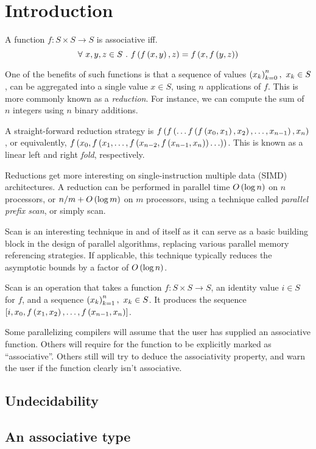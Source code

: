 \section{Introduction}

A function $f:S\times S\rightarrow S$ is associative iff.
\[\forall\ x,y,z\in S\ .\ f\p{f\p{x,y}, z} = f\p{x, f\p{y, z}}\]

One of the benefits of such functions is that a sequence of values
$\left({x_k}\right)_{k=0}^n,\ x_k\in S$, can be aggregated into a single value $x\in S$,
using $n$ applications of $f$. This is more commonly known as a
\emph{reduction}. For instance, we can compute the sum of $n$ integers using
$n$ binary additions.

A straight-forward reduction strategy is $f\left({f\left({\ldots f\left({f\left({x_0, x_1}\right),
x_2}\right), \ldots , x_{n-1}}\right), x_n}\right)$, or equivalently, $f\left({x_0, f\left({x_1, \ldots,
f\left({x_{n-2}, f\left({x_{n-1}, x_n}\right)}\right)\ldots}\right)}\right)$. This is known as a linear left and
right \emph{fold}, respectively.

Reductions get more interesting on single-instruction multiple data (SIMD)
architectures. A reduction can be performed in parallel time $O\left({\log n}\right)$ on
$n$ processors, or ${n/m}+O\left({\log m}\right)$ on $m$ processors, using a technique
called \emph{parallel prefix scan}, or simply scan.

Scan is an interesting technique in and of itself as it can serve as a basic
building block in the design of parallel algorithms, replacing various parallel
memory referencing strategies. If applicable, this technique typically reduces
the asymptotic bounds by a factor of $O\left({\log n}\right)$\cite{blelloch}.

Scan is an operation that takes a function $f:S\times S\rightarrow S$, an
identity value $i\in S$ for $f$, and a sequence $\left({x_k}\right)_{k=1}^n,\ x_k\in S$.
It produces the sequence $\left[{i, x_0, f\left({x_1,x_2}\right), \ldots, f\left({x_{n-1},
x_n}\right)}\right]$.

Some parallelizing compilers will assume that the user has supplied an
associative function. Others will require for the function to be explicitly
marked as ``associative''. Others still will try to deduce the associativity
property, and warn the user if the function clearly isn't associative.

\subsection{Undecidability}

\subsection{An associative type}

